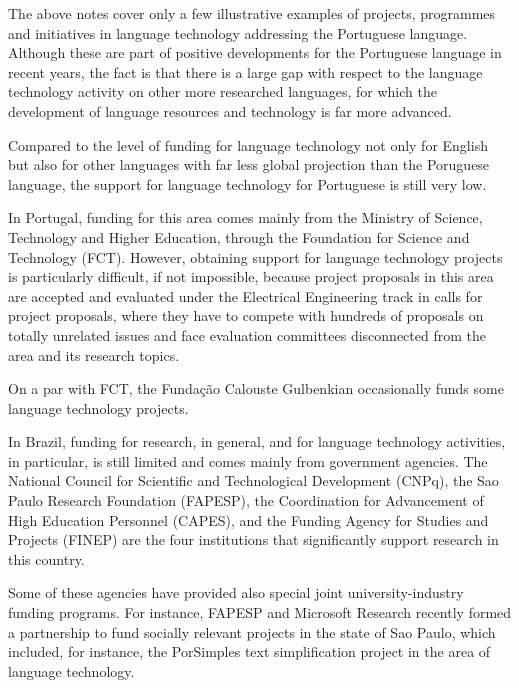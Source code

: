\begin{multicols}{2}
The above notes cover only a few illustrative examples of projects, programmes and initiatives in language technology addressing the Portuguese language. Although these are part of positive developments for the Portuguese language in recent years, the fact is that there is a large gap with respect to the language technology activity on other more researched languages, for which the development of language resources and technology is far more advanced. 

Compared to the level of funding for language technology not only for English but also for other languages
with far less global projection than the Poruguese language, 
the support for language technology for Portuguese is still very low. 

In Portugal, funding for this area comes mainly from the Ministry of Science, Technology and Higher Education, through the Foundation for Science and Technology (FCT). However, obtaining support for language technology projects is particularly difficult, if not impossible, 
because project proposals in this area are accepted and evaluated under the Electrical Engineering track in calls for project proposals, 
where they have to compete with hundreds of proposals on totally unrelated issues and face evaluation committees
disconnected from the area and its research topics. 

On a par with FCT, the Fundação Calouste Gulbenkian occasionally funds some language technology projects.


In Brazil, funding for research, in general, and for language technology activities, in particular, is still limited and comes mainly from government agencies. 
The National Council for Scientific and Technological Development (CNPq), 
the Sao Paulo Research Foundation (FAPESP), 
the Coordination for Advancement of High Education Personnel (CAPES), 
and the Funding Agency for Studies and Projects (FINEP) are the four institutions that significantly 
support research in this country. 

Some of these agencies have provided also special joint university-industry funding programs. For instance, FAPESP and Microsoft Research recently formed a partnership to fund socially relevant projects in the state of Sao Paulo, which included, for instance, the PorSimples \cite{porsimples} text simplification project in the area of language technology. 



\end{multicols}
